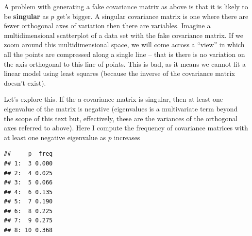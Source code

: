 \documentclass[]{book}
\newenvironment{Shaded}{\begin{snugshade}}{\end{snugshade}}
\newcommand{\KeywordTok}[1]{\textcolor[rgb]{0.13,0.29,0.53}{\textbf{#1}}}
\newcommand{\DataTypeTok}[1]{\textcolor[rgb]{0.13,0.29,0.53}{#1}}
\newcommand{\DecValTok}[1]{\textcolor[rgb]{0.00,0.00,0.81}{#1}}
\newcommand{\StringTok}[1]{\textcolor[rgb]{0.31,0.60,0.02}{#1}}
\newcommand{\ControlFlowTok}[1]{\textcolor[rgb]{0.13,0.29,0.53}{\textbf{#1}}}
\newcommand{\OperatorTok}[1]{\textcolor[rgb]{0.81,0.36,0.00}{\textbf{#1}}}
\newcommand{\NormalTok}[1]{#1}
\begin{document}
A problem with generating a fake covariance matrix as above is that it
is likely to be \textbf{singular} as \(p\) get's bigger. A singular
covariance matrix is one where there are fewer orthogonal axes of
variation then there are variables. Imagine a multidimensional
scatterplot of a data set with the fake covariance matrix. If we zoom
around this multidimensional space, we will come across a ``view'' in
which all the points are compressed along a single line -- that is there
is no variation on the axis orthogonal to this line of points. This is
bad, as it means we cannot fit a linear model using least squares
(because the inverse of the covariance matrix doesn't exist).

Let's explore this. If the a covariance matrix is singular, then at
least one eigenvalue of the matrix is negative (eigenvalues is a
multivariate term beyond the scope of this text but, effectively, these
are the variances of the orthogonal axes referred to above). Here I
compute the frequency of covariance matrices with at least one negative
eigenvalue as \(p\) increases

\begin{Shaded}
\end{Shaded}

\begin{verbatim}
##     p  freq
## 1:  3 0.000
## 2:  4 0.025
## 3:  5 0.066
## 4:  6 0.135
## 5:  7 0.190
## 6:  8 0.225
## 7:  9 0.275
## 8: 10 0.368
\end{verbatim}
\end{document}
